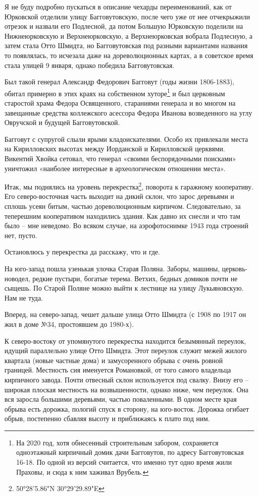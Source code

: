 Я не буду подробно пускаться в описание чехарды переименований, как от Юрковской отделили улицу Багговутовскую, после чего уже от нее отчекрыжили отрезок и назвали его Подлесной, да потом Большую Юрковскую поделили на Нижнеюрковскую и Верхнеюрковскую, а Верхнеюрковская вобрала Подлесную, а затем стала Отто Шмидта, но Багговутовская под разными вариантами названия то появлялась, то исчезала даже на дореволюционных картах, а в советское время стала улицей 9 января, однако победила Багговутовская.

Был такой генерал Александр Федорович Багговут (годы жизни 1806-1883), обитал примерно в этих краях на собственном хуторе\footnote{На 2020 год, хотя обнесенный строительным забором, сохраняется одноэтажный кирпичный домик дачи Багговутов, по адресу Багговутовская 16-18. По одной из версий считается, что именно тут одно время жили Праховы, и сюда к ним хаживал Врубель.} и был церковным старостой храма Федора Освященного, стараниями генерала и во многом на завещанные средства коллежского асессора Федора Иванова возведенного на углу Овручской и будущей Багговутовской.

Багговут с супругой слыли ярыми кладоискателями. Особо их привлекали места на Кирилловских высотах между Иорданской и Кирилловской церквями. Викентий Хвойка сетовал, что генерал «своими беспорядочными поисками» уничтожил «наиболее интересные в археологическом отношении места».

Итак, мы поднялись на уровень перекрестка\footnote{50°28'5.86"N 30°29'29.89"E}, поворота к гаражному кооперативу. Его северо-восточная часть выходит на дикий склон, что зарос деревьями и сплошь усеян битым, частью дореволюционным кирпичом. Следовательно, за теперешним кооперативом находились здания. Как давно их снесли и что там было – мне неведомо. Во всяком случае, на аэрофотоснимке 1943 года строений нет, пусто.

Остановлюсь у перекрестка да расскажу, что и где.

На юго-запад пошла узенькая улочка Старая Поляна. Заборы, машины, церковь-новодел, редкие пустыри, богатые терема. Ветхих, бедных домиков почти не сыщешь. По Старой Поляне можно выйти к лестнице на улицу Лукьяновскую. Нам не туда.

Вперед, на северо-запад, чешет дальше улица Отто Шмидта (с 1908 по 1917 он жил в доме №34, простоявшем до 1980-х).

К северо-востоку от упомянутого перекрестка находится безымянный переулок, идущий параллельно улице Отто Шмидта. Этот переулок служит межей жилого квартала (новые частные дома) и замусоренного обрыва с очень ровной границей. Местность сия именуется Романовкой, от того самого владельца кирпичного завода. Почти отвесный склон используется под свалку. Внизу его – широкая плоская местность на возвышенности, однако ниже, чем переулок. Она вся заросла большими деревьями, частью поваленными. В одном месте края обрыва есть дорожка, пологий спуск в сторону, на юго-восток. Дорожка огибает обрыв, постепенно сбавляя высоту и приближаясь к плато под ним.

